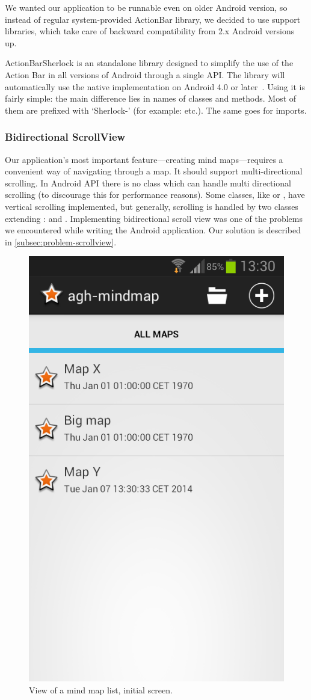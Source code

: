 We wanted our application to be runnable even on older Android version, so instead of regular system-provided ActionBar library, we decided to use support libraries, which take care of backward compatibility from 2.x Android versions up.

ActionBarSherlock is an standalone library designed to simplify the use of the Action Bar in all versions of Android through a single API. The library will automatically use the native  implementation on Android 4.0 or later~\cite{Wharton:2013:sherlock}. Using it is fairly simple: the main difference lies in names of  classes and methods. Most of them are prefixed with `Sherlock-' (for example:  etc.). The same goes for imports.

\subsubsection{Bidirectional ScrollView}
\label{subsubsec:action-bar}
Our application's most important feature---creating mind maps---requires a convenient way of navigating through a map. It should support multi-directional scrolling. In Android API there is no class which can handle multi directional scrolling (to discourage this for performance reasons). Some classes, like  or , have vertical scrolling implemented, but generally, scrolling is handled by two classes extending :  and . Implementing bidirectional scroll view was one of the problems we encountered while writing the Android application. Our solution is described in \cref{subsec:problem-scrollview}.

\begin{figure}[h]
	\centering
	\includegraphics[width=.5\textwidth]{graphics-screenshot-list}
	\caption{View of a mind map list, initial screen.}
	\label{fig:screen-maplist}
\end{figure}

